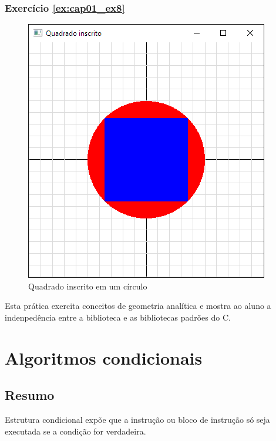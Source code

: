 \subsection*{Exercício \ref{ex:cap01_ex8}}
\begin{figure}[ht]
  \centerline{\includegraphics[width=.5\textwidth]{img/cap1_ex8.png}}
  \caption{Quadrado inscrito em um círculo}
  \label{fig:cap01_ex4}
\end{figure}

Esta prática exercita conceitos de geometria analítica e mostra ao aluno a indenpedência entre a biblioteca \playAPC{} e as bibliotecas padrões do C.



\chapter[Algoritmos condicionais]
{Algoritmos condicionais}



\section*{Resumo}

Estrutura condicional expõe que a instrução ou bloco de instrução só seja executada se a condição for verdadeira.


%



